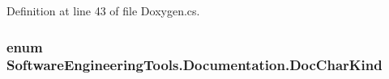 Definition at line 43 of file Doxygen.\+cs.

\hypertarget{namespace_software_engineering_tools_1_1_documentation_a0c5911a87d97bd4d61eaf7e0d5fe2d35}{
\subsubsection[{Doc\+Char\+Kind}]{\setlength{\rightskip}{0pt plus 5cm}enum {\bf Software\+Engineering\+Tools.\+Documentation.\+Doc\+Char\+Kind}}}\label{namespace_software_engineering_tools_1_1_documentation_a0c5911a87d97bd4d61eaf7e0d5fe2d35}
